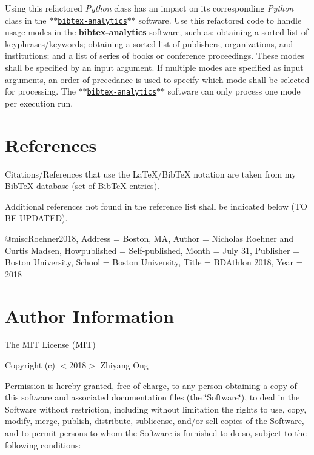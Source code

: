 Using this refactored {\itshape Python} class has an impact on its corresponding {\itshape Python} class in the $\ast$$\ast$\href{https://github.com/eda-ricercatore/bibtex-analytics}{\tt bibtex-\/analytics}$\ast$$\ast$ software. Use this refactored code to handle usage modes in the {\bfseries bibtex-\/analytics} software, such as\+: obtaining a sorted list of keyphrases/keywords; obtaining a sorted list of publishers, organizations, and institutions; and a list of series of books or conference proceedings. These modes shall be specified by an input argument. If multiple modes are specified as input arguments, an order of precedance is used to specify which mode shall be selected for processing. The $\ast$$\ast$\href{https://github.com/eda-ricercatore/bibtex-analytics}{\tt bibtex-\/analytics}$\ast$$\ast$ software can only process one mode per execution run.

\section*{References}

Citations/\+References that use the La\+Te\+X/\+Bib\+Te\+X notation are taken from my Bib\+Te\+X database (set of Bib\+Te\+X entries).

Additional references not found in the reference list shall be indicated below (T\+O B\+E U\+P\+D\+A\+T\+E\+D).

\begin{DoxyVerb}@misc{Roehner2018,
    Address = {Boston, {MA}},
    Author = {Nicholas Roehner and Curtis Madsen},
    Howpublished = {Self-published},
    Month = {July 31},
    Publisher = {Boston University},
    School = {Boston University},
    Title = {BDAthlon 2018},
    Year = {2018}}
\end{DoxyVerb}


\section*{Author Information}

The M\+I\+T License (M\+I\+T)

Copyright (c) $<$2018$>$ Zhiyang Ong

Permission is hereby granted, free of charge, to any person obtaining a copy of this software and associated documentation files (the \char`\"{}\+Software\char`\"{}), to deal in the Software without restriction, including without limitation the rights to use, copy, modify, merge, publish, distribute, sublicense, and/or sell copies of the Software, and to permit persons to whom the Software is furnished to do so, subject to the following conditions\+:

